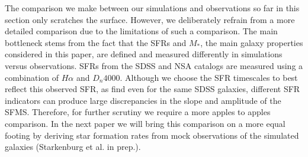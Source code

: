 \documentclass[preprint2,tighten]{aastex62}
\newcommand{\todo}[1]{{\bf \textcolor{red}{ #1}}}
\begin{document}

The comparison we make between our simulations and observations so far in 
this section only scratches the surface. However, we deliberately refrain 
from a more detailed comparison due to the limitations of such a comparison. 
The main bottleneck stems from the fact that the SFRs and $M_*$, the main
galaxy properties considered in this paper, are defined and measured 
differently in simulations versus observations. SFRs from the SDSS and 
NSA catalogs are measured using a combination of $H\alpha$ and $D_n 4000$. 
Although we choose the SFR timescales to best reflect this observed SFR, 
as \cite{speagle2014} find even for the same SDSS galaxies, different SFR 
indicators can produce large discrepancies in the slope and amplitude of 
the SFMS. Therefore, for further scrutiny we require a more apples to apples 
comparison. In the next paper we will bring this comparison on a more equal 
footing by deriving star formation rates from mock observations of the 
simulated galaxies (Starkenburg et al. in prep.).

\end{document}
